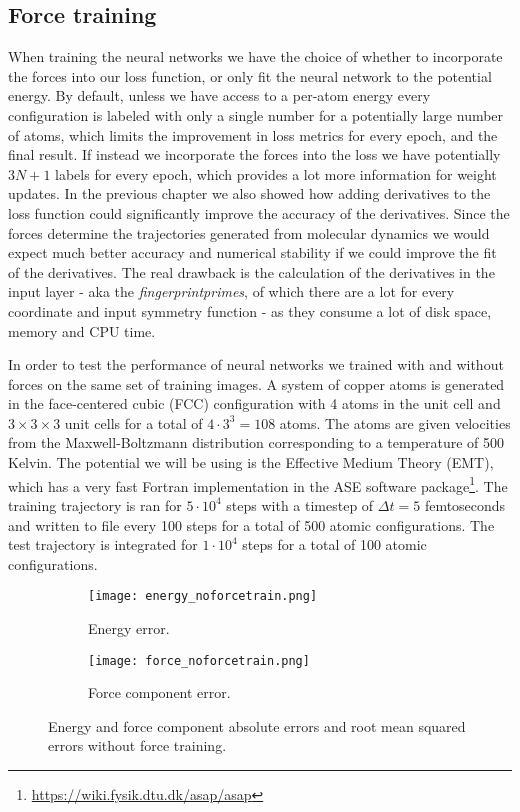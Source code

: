 \subsection{Force training}
When training the neural networks we have the choice of whether
to incorporate the forces into our loss function, or only fit
the neural network to the potential energy. By default, unless
we have access to a per-atom energy every configuration is labeled
with only a single number for a potentially large number of atoms,
which limits the improvement in loss metrics for every epoch,
and the final result. If instead we incorporate the forces into the
loss we have potentially $3N + 1$ labels for every epoch,
which provides a lot more information for weight updates.
In the previous chapter we also showed how adding derivatives to
the loss function could significantly improve the accuracy of the
derivatives. Since the forces determine the trajectories generated
from molecular dynamics we would expect much better
accuracy and numerical stability if we could improve the fit of
the derivatives.
The real drawback is the calculation of the derivatives in the input layer - 
aka the \textit{fingerprintprimes}, of which there are a lot for every coordinate
and input symmetry function - as they consume a lot of disk space,
memory and CPU time.
\par
In order to test the performance of neural networks
we trained with and without forces on the same set of training images.
A system of copper atoms is generated in the face-centered cubic (FCC)
configuration with 4 atoms in the unit cell and $3 \times 3 \times 3$
unit cells for a total of $4 \cdot 3^3 = 108$ atoms. The
atoms are given velocities from the Maxwell-Boltzmann distribution
corresponding to a temperature of 500 Kelvin. The potential we will
be using is the Effective Medium Theory (EMT), which has a very
fast Fortran implementation in the ASE software package\footnote{
\url{https://wiki.fysik.dtu.dk/asap/asap}}.
The training trajectory is ran for $5 \cdot 10^4$ steps with
a timestep of $\Delta t = 5$ femtoseconds and written to file every 100 steps
for a total of 500 atomic configurations. The test trajectory is
integrated for $1 \cdot 10^4$ steps for a total of 100 atomic configurations.

\begin{figure}[H]
\begin{adjustbox}{max width=1.2\linewidth,center}
\centering
  \begin{subfigure}[b]{0.55\textwidth}
      \texttt{[image: energy\_noforcetrain.png]}
      \caption{Energy error.}
    \label{fig:f1}
  \end{subfigure}
  \hfill
  \begin{subfigure}[b]{0.55\textwidth}
      \texttt{[image: force\_noforcetrain.png]}
      \caption{Force component error.}
    \label{fig:f2}
  \end{subfigure}
\end{adjustbox}
\caption{Energy and force component absolute errors and root mean
    squared errors without force training.}
    \label{fig:noforcetrain}
\end{figure}

